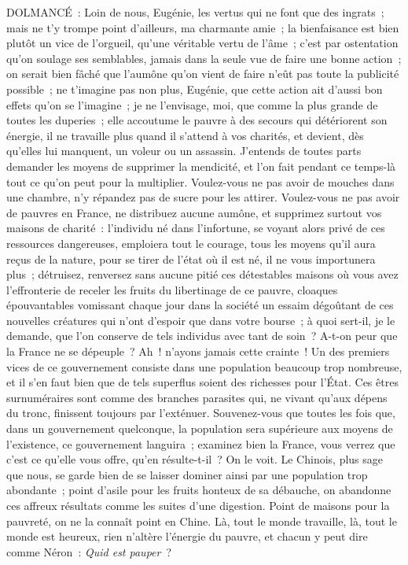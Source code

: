\documentclass[french,twoside]{book} %
\begin{document}
DOLMANCÉ : Loin de nous, Eugénie, les vertus qui ne font que des ingrats ; mais ne t’y trompe point d’ailleurs, ma charmante amie ; la bienfaisance est bien plutôt un vice de l’orgueil, qu’une véritable vertu de l’âme ; c’est par ostentation qu’on soulage ses semblables, jamais dans la seule vue de faire une bonne action ; on serait bien fâché que l’aumône qu’on vient de faire n’eût pas toute la publicité possible ; ne t’imagine pas non plus, Eugénie, que cette action ait d’aussi bon effets qu’on se l’imagine ; je ne l’envisage, moi, que comme la plus grande de toutes les duperies ; elle accoutume le pauvre à des secours qui détériorent son énergie, il ne travaille plus quand il s’attend à vos charités, et devient, dès qu’elles lui manquent, un voleur ou un assassin. J’entends de toutes parts demander les moyens de supprimer la mendicité, et l’on fait pendant ce temps-là tout ce qu’on peut pour la multiplier. Voulez-vous ne pas avoir de mouches dans une chambre, n’y répandez pas de sucre pour les attirer. Voulez-vous ne pas avoir de pauvres en France, ne distribuez aucune aumône, et supprimez surtout vos maisons de charité : l’individu né dans l’infortune, se voyant alors privé de ces ressources dangereuses, emploiera tout le courage, tous les moyens qu’il aura reçus de la nature, pour se tirer de l’état où il est né, il ne vous importunera plus ; détruisez, renversez sans aucune pitié ces détestables maisons où vous avez l’effronterie de receler les fruits du libertinage de ce pauvre, cloaques épouvantables vomissant chaque jour dans la société un essaim dégoûtant de ces nouvelles créatures qui n’ont d’espoir que dans votre bourse ; à quoi sert-il, je le demande, que l’on conserve de tels individus avec tant de soin ? A-t-on peur que la France ne se dépeuple ? Ah ! n’ayons jamais cette crainte ! Un des premiers vices de ce gouvernement consiste dans une population beaucoup trop nombreuse, et il s’en faut bien que de tels superflus soient des richesses pour l’État. Ces êtres surnuméraires sont comme des branches parasites qui, ne vivant qu’aux dépens du tronc, finissent toujours par l’exténuer. Souvenez-vous que toutes les fois que, dans un gouvernement quelconque, la population sera supérieure aux moyens de l’existence, ce gouvernement languira ; examinez bien la France, vous verrez que c’est ce qu’elle vous offre, qu’en résulte-t-il ? On le voit. Le Chinois, plus sage que nous, se garde bien de se laisser dominer ainsi par une population trop abondante ; point d’asile pour les fruits honteux de sa débauche, on abandonne ces affreux résultats comme les suites d’une digestion. Point de maisons pour la pauvreté, on ne la connaît point en Chine. Là, tout le monde travaille, là, tout le monde est heureux, rien n’altère l’énergie du pauvre, et chacun y peut dire comme Néron : {\itshape Quid est pauper} ?\par
\end{document}
